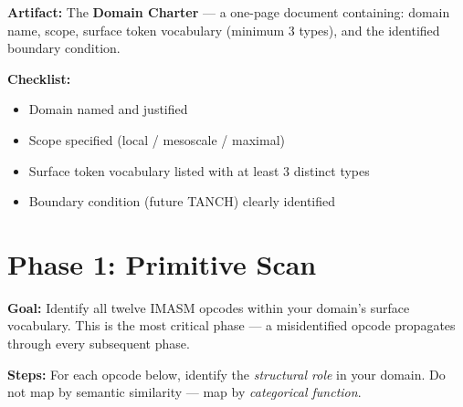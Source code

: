 \documentclass[12pt,a4paper]{article}
\begin{document}
{\bf Artifact:} The \textbf{Domain Charter} — a one-page document containing:
domain name, scope, surface token vocabulary (minimum 3 types), and the identified
boundary condition.

{\bf Checklist:}
\begin{itemize}
\item[ ] Domain named and justified
\item[ ] Scope specified (local / mesoscale / maximal)
\item[ ] Surface token vocabulary listed with at least 3 distinct types
\item[ ] Boundary condition (future TANCH) clearly identified
\end{itemize}

\section{Phase 1: Primitive Scan}

{\bf Goal:} Identify all twelve IMASM opcodes within your domain's surface vocabulary.
This is the most critical phase — a misidentified opcode propagates through every
subsequent phase.

{\bf Steps:} For each opcode below, identify the \emph{structural role} in your domain.
Do not map by semantic similarity — map by \emph{categorical function}.
\end{document}
